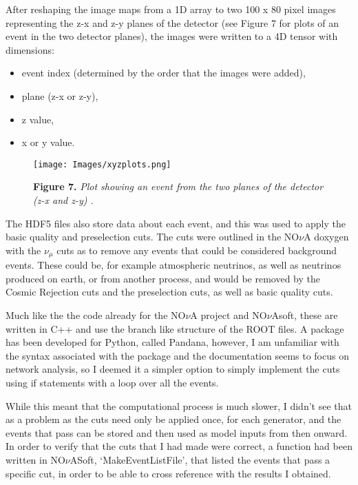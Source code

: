 \noindent After reshaping the image maps from a 1D array to two 100 x 80 pixel images representing the z-x and z-y planes of the detector (see Figure 7 for plots of an event in the two detector planes), the images were written to a 4D tensor with dimensions:
{\begin{itemize}
 \vspace*{-3mm}
\item event index (determined by the order that the images were added),
 \vspace*{-3mm}
\item plane (z-x or z-y),
 \vspace*{-3mm}
\item z value,
 \vspace*{-3mm}
\item x or y value.
 \vspace*{-3mm}
  \end{itemize}}
    
\begin{figure}[t!]
 \centering
 \texttt{[image: Images/xyzplots.png]}
 
 \textbf{Figure 7.} \textit{Plot showing an event from the two planes of the detector (z-x and z-y) .}
\end{figure}

\noindent The HDF5 files also store data about each event, and this was used to apply the basic quality and preselection cuts. The cuts were outlined in the NO$\nu$A doxygen with the $\nu_\mu$ cuts as to remove any events that could be considered background events. These could be, for example atmospheric neutrinos, as well as neutrinos produced on earth, or from another process, and would be removed by the Cosmic Rejection cuts and the preselection cuts, as well as basic quality cuts.\medskip

\noindent Much like the the code already for the NO$\nu$A project and NO$\nu$Asoft, these are written in C++ and use the branch like structure of the ROOT files. A package has been developed for Python, called Pandana, however, I am unfamiliar with the syntax associated with the package and the documentation seems to focus on network analysis, so I deemed it a simpler option to simply implement the cuts using if statements with a loop over all the events. \medskip

\noindent While this meant that the computational process is much slower, I didn't see that as a problem as the cuts need only be applied once, for each generator, and the events that pass can be stored and then used as model inputs from then onward. In order to verify that the cuts that I had made were correct, a function had been written in NO$\nu$ASoft, ‘MakeEventListFile’, that listed the events that pass a specific cut, in order to be able to cross reference with the results I obtained.\medskip

